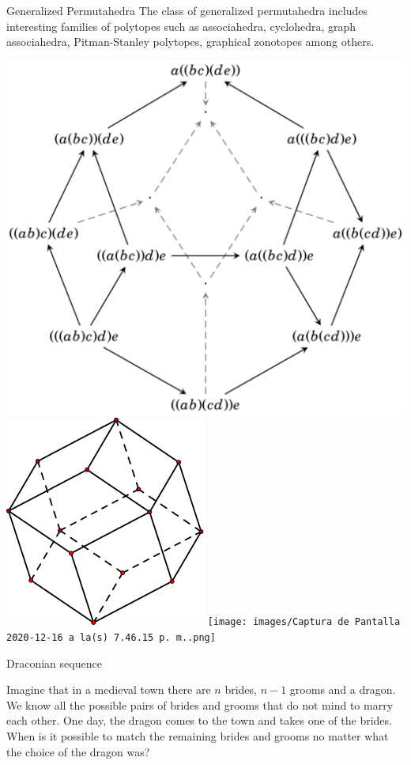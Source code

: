 \documentclass{beamer}
\begin{document}
\begin{frame}{Generalized Permutahedra}
 The class of generalized permutahedra includes interesting families of polytopes such as associahedra, cyclohedra, graph associahedra, Pitman-Stanley polytopes, graphical zonotopes among others.
 \begin{center}
      \includegraphics[scale=0.25]{images/Associahedron_K5_front_512.png}
      \hspace{1cm}
      \includegraphics[scale=0.22]{images/7-Figure2-1.png}
      \texttt{[image: images/Captura de Pantalla 2020-12-16 a la(s) 7.46.15 p. m..png]}

 \end{center}

\end{frame}

\begin{frame}{Draconian sequence}
\begin{definition}
Imagine that in a medieval town there are $n$ brides, $n-1$ grooms and a dragon. We know all the possible pairs of brides and grooms that do not mind to marry each other. One day, the dragon comes to the town and takes one of the brides. When is it possible to match the remaining brides and grooms no matter what the choice of the dragon was?
\end{definition}

\end{frame}
\end{document}
